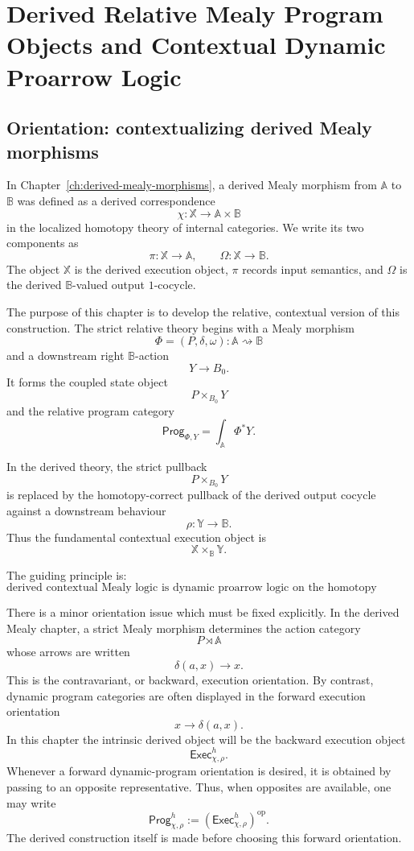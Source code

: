 \chapter{\texorpdfstring{Derived Relative Mealy Program Objects and Contextual Dynamic Proarrow Logic}{Derived Relative Mealy Program Objects and Contextual Dynamic Proarrow Logic}}
\label{ch:derived-relative-mealy-program-objects}

\section{Orientation: contextualizing derived Mealy morphisms}
\label{sec:derived-relative-orientation}

In Chapter~\ref{ch:derived-mealy-morphisms}, a derived Mealy morphism from
\(\mathbb A\) to \(\mathbb B\) was defined as a derived correspondence
\[
\chi:\mathbb X\to \mathbb A\times \mathbb B
\]
in the localized homotopy theory of internal categories. We write its two
components as
\[
\pi:\mathbb X\to\mathbb A,
\qquad
\Omega:\mathbb X\to\mathbb B.
\]
The object \(\mathbb X\) is the derived execution object, \(\pi\) records
input semantics, and \(\Omega\) is the derived \(\mathbb B\)-valued output
\(1\)-cocycle.

The purpose of this chapter is to develop the relative, contextual version of
this construction. The strict relative theory begins with a Mealy morphism
\[
\Phi=(P,\delta,\omega):\mathbb A\rightsquigarrow\mathbb B
\]
and a downstream right \(\mathbb B\)-action
\[
Y\to B_0.
\]
It forms the coupled state object
\[
P\times_{B_0}Y
\]
and the relative program category
\[
\mathsf{Prog}_{\Phi,Y}
=
\int_{\mathbb A}\Phi^\ast Y.
\]

In the derived theory, the strict pullback
\[
P\times_{B_0}Y
\]
is replaced by the homotopy-correct pullback of the derived output cocycle
against a downstream behaviour
\[
\rho:\mathbb Y\to\mathbb B.
\]
Thus the fundamental contextual execution object is
\[
\mathbb X\times_{\mathbb B}\mathbb Y.
\]

The guiding principle is:
\[
\boxed{
\text{derived contextual Mealy logic is dynamic proarrow logic on the
homotopy pullback of an output cocycle with a downstream behaviour.}
}
\]

There is a minor orientation issue which must be fixed explicitly. In the
derived Mealy chapter, a strict Mealy morphism determines the action category
\[
P\rtimes\mathbb A
\]
whose arrows are written
\[
\delta(a,x)\longrightarrow x.
\]
This is the contravariant, or backward, execution orientation. By contrast,
dynamic program categories are often displayed in the forward execution
orientation
\[
x\longrightarrow \delta(a,x).
\]
In this chapter the intrinsic derived object will be the backward execution
object
\[
\mathsf{Exec}^h_{\chi,\rho}.
\]
Whenever a forward dynamic-program orientation is desired, it is obtained by
passing to an opposite representative. Thus, when opposites are available, one
may write
\[
\mathsf{Prog}^h_{\chi,\rho}
:=
\left(\mathsf{Exec}^h_{\chi,\rho}\right)^{\mathrm{op}}.
\]
The derived construction itself is made before choosing this forward
orientation.

